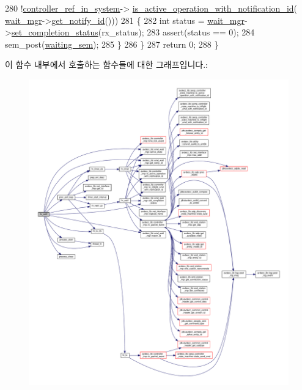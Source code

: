 \begin{DoxyCode}
280             !\hyperlink{namespaceavdecc__lib_a8f621b84ee2ae87ab9a54ca441e21f9b}{controller\_ref\_in\_system}->
      \hyperlink{classavdecc__lib_1_1controller__imp_a478e43b65aafe1a0e927e84304047003}{is\_active\_operation\_with\_notification\_id}(
      \hyperlink{classavdecc__lib_1_1system__layer2__multithreaded__callback_af8628baeb5f5db798721c4af01e8b253}{wait\_mgr}->\hyperlink{classavdecc__lib_1_1cmd__wait__mgr_acae98c938b8473f03ddd1a430e30be1d}{get\_notify\_id}()))
281         \{
282             \textcolor{keywordtype}{int} status = \hyperlink{classavdecc__lib_1_1system__layer2__multithreaded__callback_af8628baeb5f5db798721c4af01e8b253}{wait\_mgr}->\hyperlink{classavdecc__lib_1_1cmd__wait__mgr_a979ab3347d7c228509b928383b7861ca}{set\_completion\_status}(rx\_status);
283             assert(status == 0);
284             sem\_post(\hyperlink{classavdecc__lib_1_1system__layer2__multithreaded__callback_a48196bb38ecccc4d99ae5c5d65e8b430}{waiting\_sem});
285         \}
286     \}
287     \textcolor{keywordflow}{return} 0;
288 \}
\end{DoxyCode}


이 함수 내부에서 호출하는 함수들에 대한 그래프입니다.\+:
\nopagebreak
\begin{figure}[H]
\begin{center}
\leavevmode
\includegraphics[width=350pt]{classavdecc__lib_1_1system__layer2__multithreaded__callback_a9970e4469c716b1b2eee9e5d05b748ed_cgraph}
\end{center}
\end{figure}


